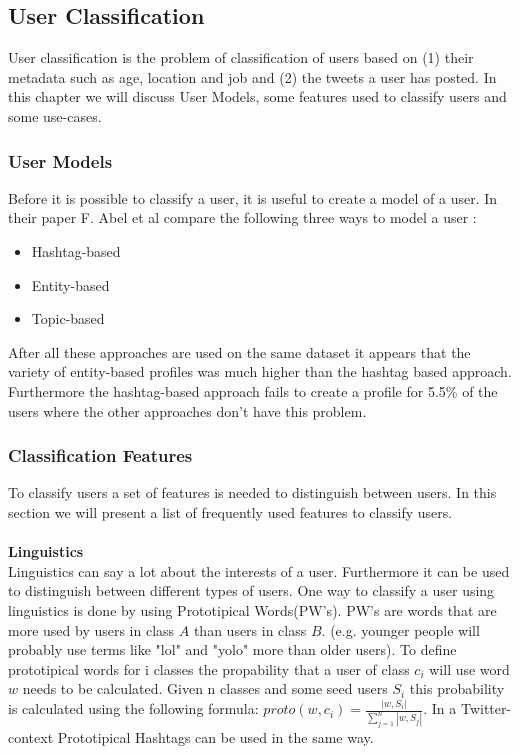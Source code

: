 \documentclass{article}
\begin{document}
\subsection{User Classification}
User classification is the problem of classification of users based on (1) their metadata such as age, location and job and (2) the tweets a user has posted. In this chapter we will discuss User Models, some features used to classify users and some use-cases. 
\subsubsection{User Models}
Before it is possible to classify a user, it is useful to create a model of a user. In their paper F. Abel et al compare the following three ways to model a user \cite{usermodel}:
\begin{itemize}
\item Hashtag-based
\item Entity-based
\item Topic-based

\end{itemize}
After all these approaches are used on the same dataset it appears that the variety of entity-based profiles was much higher than the hashtag based approach. \cite{usermodel} Furthermore the hashtag-based approach fails to create a profile for 5.5\% of the users where the other approaches don't have this problem.  

\subsubsection{Classification Features}
To classify users a set of features is needed to distinguish between users. In this section we will present a list of frequently used features to classify users.  
\\\\
\textbf{Linguistics}\\
Linguistics can say a lot about the interests of a user. Furthermore it can be used to distinguish between different types of users. One way to classify a user using linguistics is done by using Prototipical Words(PW's). \cite{userclasst} PW's are words that are more used by users in class $A$ than users in class $B$. (e.g. younger people will probably use terms like "lol" and "yolo" more than older users). To define prototipical words for i classes the propability that a user of class $c_i$ will use word $w$ needs to be calculated. Given n classes and some seed users $S_i$ this probability is calculated using the following formula: $proto(w, c_i) = \frac{|w, S_i|}{\sum_{j=1}^n |w, S_j|}$. \cite{userclasst} In a Twitter-context Prototipical Hashtags can be used in the same way.
\end{document}
